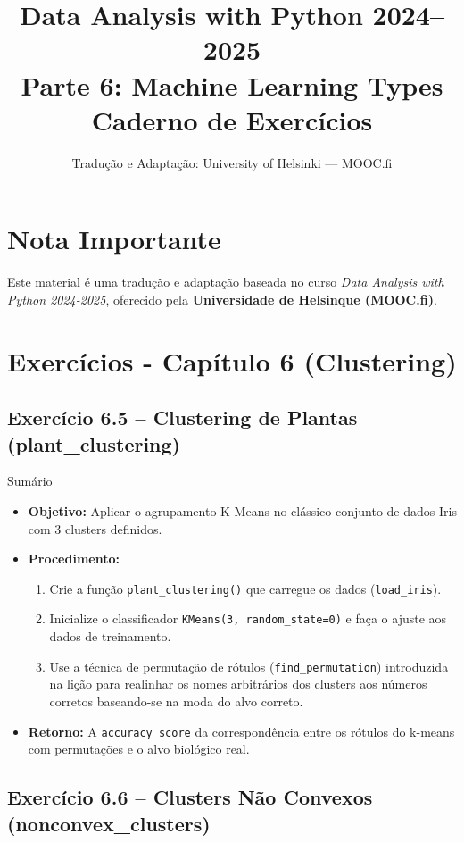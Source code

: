 \documentclass[11pt,a4paper]{article}
\title{\textbf{Data Analysis with Python 2024--2025}\\Parte 6: Machine Learning Types\\\large Caderno de Exercícios}
\author{Tradução e Adaptação: University of Helsinki --- MOOC.fi}
\date{}
\begin{document}
\maketitle

\section*{Nota Importante}
Este material é uma tradução e adaptação baseada no curso \textit{Data Analysis with Python 2024-2025}, oferecido pela \textbf{Universidade de Helsinque (MOOC.fi)}.

\tableofcontents
\newpage

\section{Exercícios - Capítulo 6 (Clustering)}

\subsection*{Exercício 6.5 -- Clustering de Plantas (plant\_clustering)}

\begin{exercicio}{Sumário}
\begin{itemize}
    \item \textbf{Objetivo:} Aplicar o agrupamento K-Means no clássico conjunto de dados Iris com 3 clusters definidos.
    \item \textbf{Procedimento:}
    \begin{enumerate}
        \item Crie a função \texttt{plant\_clustering()} que carregue os dados (\texttt{load\_iris}).
        \item Inicialize o classificador \texttt{KMeans(3, random\_state=0)} e faça o ajuste aos dados de treinamento.
        \item Use a técnica de permutação de rótulos (\texttt{find\_permutation}) introduzida na lição para realinhar os nomes arbitrários dos clusters aos números corretos baseando-se na moda do alvo correto.
    \end{enumerate}
    \item \textbf{Retorno:} A \texttt{accuracy\_score} da correspondência entre os rótulos do k-means com permutações e o alvo biológico real.
\end{itemize}
\end{exercicio}

\subsection*{Exercício 6.6 -- Clusters Não Convexos (nonconvex\_clusters)}
\end{document}
